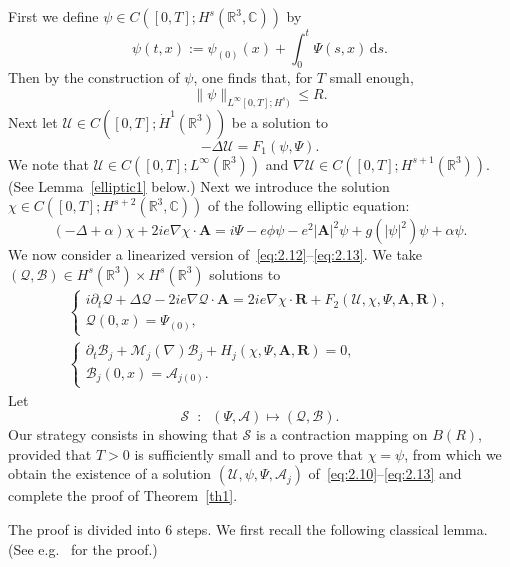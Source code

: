 \documentclass[AHL,Unicode,longabstracts]{cedram}
\newcommand{\BA}{\mathbf{A}}
\newcommand{\BR}{\mathbf{R}}
\newcommand{\R}{\mathbb{R}}
\newcommand{\Com}{\mathbb{C}}
\newcommand*{\dd}{\mathrm{d}}
\newcommand*{\ds}{\dd s}
\begin{document}
First we define $\psi\in C([0,T];H^s(\R^3,\Com))$ by
\begin{equation}\label{psi}
\psi(t,x):=\psi_{(0)}(x)+ \int_0^t \Psi(s,x) \,\ds.
\end{equation}
Then by the construction of $\psi$, one finds that, for $T$ small enough,
\[
\| \psi\|_{L^{\infty}[0,T]; H^s)} \le R.
\]
Next let $\mathcal{U}\in C([0,T];\dot{H}^1(\R^3))$ be a solution to
\begin{equation}\label{eq:3.1}
-\Delta \mathcal{U} = F_1(\psi,\Psi).
\end{equation}
We note that $\mathcal{U} \in C([0,T]; L^{\infty}(\R^3))$ and $\nabla \mathcal{U} \in C([0,T];H^{s+1}(\R^3))$. (See Lemma~\ref{elliptic1} below.) Next we introduce the solution $\chi \in C([0,T];H^{s+2}(\R^3,\Com))$ of the following elliptic equation:
\begin{equation}\label{eq:3.2}
(-\Delta+\alpha) \chi + 2 ie \nabla \chi\cdot \BA = i\Psi -e\phi \psi -e^2 |\BA|^2 \psi +g(|\psi|^2)\psi+\alpha \psi.
\end{equation}
We now consider a linearized version of~\eqref{eq:2.12}--\eqref{eq:2.13}. We take $(\mathcal{Q},\mathcal{B}) \in H^s(\R^3) \times H^s(\R^3)$ solutions to
\begin{gather}\label{eq:3.3}
\begin{cases}
i\partial_t \mathcal{Q}+\Delta \mathcal{Q}- 2i e \nabla \mathcal{Q} \cdot \BA = 2ie \nabla\chi \cdot \BR+F_2(\mathcal{U},\chi,\Psi,\BA, \BR), \\
\mathcal{Q}(0,x)=\Psi_{(0)},
\end{cases}
\\ \label{eq:3.4}
\begin{cases}
\partial_t \mathcal{B}_j+\mathcal{M}_j(\nabla)\mathcal{B}_j+H_j(\chi,\Psi, \BA, \BR)=0,\\
\mathcal{B}_j(0,x)=\mathcal{A}_{j(0)}.
\end{cases}
\end{gather}
Let
\[
\mathcal{S}\;\; :\;\; (\Psi,\mathcal{A}) \longmapsto (\mathcal{Q},\mathcal{B}).
\]
Our strategy consists in showing that $\mathcal{S}$ is a contraction mapping on $B(R)$, provided that $T>0$ is sufficiently small and to prove that $\chi=\psi$, from which we obtain the existence of a solution $(\mathcal{U}, \psi, \Psi, \mathcal{A}_j)$ of~\eqref{eq:2.10}--\eqref{eq:2.13} and complete the proof of Theorem~\ref{th1}.

The proof is divided into 6 steps. We first recall the following classical lemma. (See e.g.~\cite[Proposition~2.1.1, p.~98]{AG} for the proof.)
\end{document}
